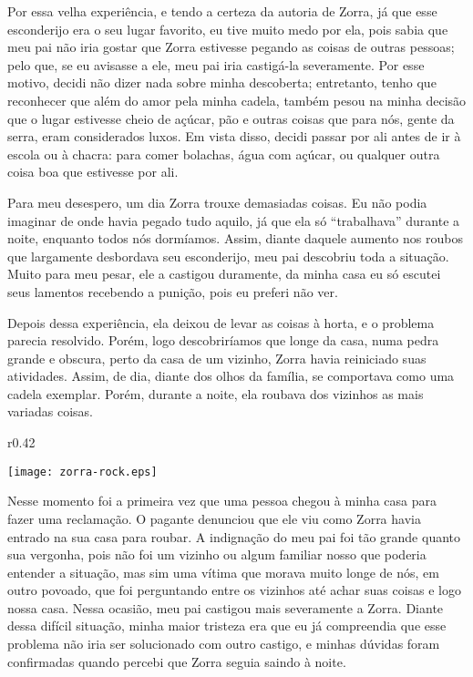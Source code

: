 Por essa velha experiência, e tendo a certeza da autoria de Zorra, já que esse esconderijo era o seu lugar favorito, eu tive muito medo por ela, pois sabia que meu pai não iria gostar que Zorra estivesse pegando as coisas de outras pessoas; pelo que, se eu avisasse a ele, meu pai iria castigá-la severamente. Por esse motivo, decidi não dizer nada sobre minha descoberta; entretanto, tenho que reconhecer que além do amor pela minha cadela, também pesou na minha decisão que o lugar estivesse cheio de açúcar, pão e outras coisas que para nós, gente da serra, eram considerados luxos. 
Em vista disso, decidi passar por ali antes de ir à escola ou à chacra: para comer bolachas, água com açúcar, ou qualquer outra coisa boa que estivesse por ali. 

Para meu desespero, um dia Zorra trouxe demasiadas coisas. Eu  não podia imaginar de onde havia pegado tudo aquilo, já que ela só ``trabalhava'' durante a noite, enquanto todos nós dormíamos. Assim, diante daquele aumento nos roubos que largamente desbordava seu esconderijo, meu pai descobriu toda a situação.
Muito para meu pesar, ele a castigou duramente, da minha casa eu só escutei seus lamentos recebendo a punição, pois eu preferi não ver.


Depois dessa experiência, ela deixou de levar as coisas à horta, e o problema parecia resolvido. Porém, logo descobriríamos que longe da casa, numa pedra grande e obscura, perto da casa de um vizinho, 
Zorra havia reiniciado suas atividades. Assim, de dia, diante dos olhos da família, se comportava como uma cadela exemplar. Porém, durante a noite, ela roubava dos vizinhos as mais variadas coisas.

\ifdefined\EnableIncludeImages
\begin{wrapfigure}{r}{0.42\textwidth}
  \begin{center}
  \vspace{-10pt}
    \texttt{[image: zorra-rock.eps]}
  \end{center}
  \vspace{-20pt}
\end{wrapfigure}
\fi
Nesse momento foi a primeira vez que uma pessoa chegou à minha casa para fazer uma reclamação. O pagante denunciou que ele viu como Zorra havia entrado na sua casa para roubar. 
A indignação do meu pai foi tão grande quanto sua vergonha, pois não foi um vizinho ou algum familiar nosso que poderia entender a situação, mas sim uma vítima que morava muito longe de nós, em outro povoado, que foi perguntando entre os vizinhos até achar suas coisas e logo nossa casa.
Nessa ocasião, meu pai castigou mais severamente a Zorra. Diante dessa difícil situação, minha maior tristeza era que eu já compreendia que esse problema não iria ser solucionado com outro castigo, e minhas dúvidas foram confirmadas quando percebi que Zorra seguia saindo à noite. 

